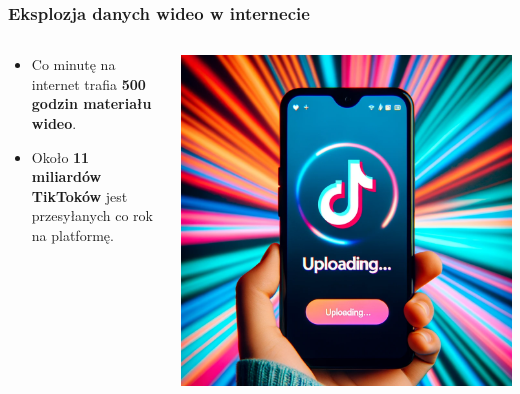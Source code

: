 \documentclass[smaller]{beamer}
\begin{document}
\begin{frame}
\frametitle{Eksplozja danych wideo w internecie}

\begin{columns}
    \begin{column}{0.6\textwidth}
        \begin{itemize}
            \item Co minutę na internet trafia \textbf{500 godzin materiału wideo}.
            \item Około \textbf{11 miliardów TikToków} jest przesyłanych co rok na platformę.
        \end{itemize}
    \end{column}

    \begin{column}{0.4\textwidth}
        \includegraphics[width=\textwidth]{../manifest/tt.png} %
    \end{column}
\end{columns}
\end{frame}

\end{document}
